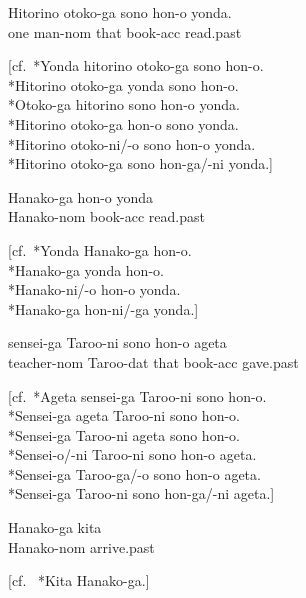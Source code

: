 \documentclass[a4paper,landscape,headrule,footrule]{foils}
\begin{document}
\begin{exe}
  \ex %
  \gll Hitorino  otoko-ga sono  hon-o yonda. \\
 one  man-{\sc nom} that  book-{\sc acc} read.{\sc past} \\

[cf.\ *Yonda hitorino otoko-ga sono hon-o. \\ {*}Hitorino otoko-ga yonda
sono hon-o. \\ {*}Otoko-ga hitorino sono hon-o yonda. \\ {*}Hitorino
otoko-ga hon-o sono yonda. \\ {*}Hitorino otoko-ni/-o sono hon-o
yonda. \\ {*}Hitorino otoko-ga sono hon-ga/-ni yonda.]  

\ex 
\gll  Hanako-ga  hon-o  yonda \\
 Hanako-{\sc nom}  book-{\sc acc}  read.{\sc past} \\

[cf.\ *Yonda Hanako-ga hon-o. \\ {*}Hanako-ga yonda hon-o. \\
{*}Hanako-ni/-o hon-o yonda. \\ {*}Hanako-ga hon-ni/-ga yonda.]

\ex \label{5}
\gll   sensei-ga  Taroo-ni  sono   hon-o  ageta \\
 teacher-{\sc nom} Taroo-{\sc dat} that   book-{\sc acc} gave.{\sc past} \\

[cf.\ *Ageta sensei-ga Taroo-ni sono hon-o. \\ {*}Sensei-ga ageta Taroo-ni
sono hon-o. \\ {*}Sensei-ga Taroo-ni ageta sono hon-o. \\ {*}Sensei-o/-ni
Taroo-ni sono hon-o ageta. \\ {*}Sensei-ga Taroo-ga/-o sono hon-o ageta.\\
{*}Sensei-ga Taroo-ni sono hon-ga/-ni ageta.]

%

\ex\label{2}
\gll Hanako-ga   kita \\
 Hanako-{\sc nom}   arrive.{\sc past} \\

[cf. \ *Kita Hanako-ga.]

\end{exe}
\end{document}
